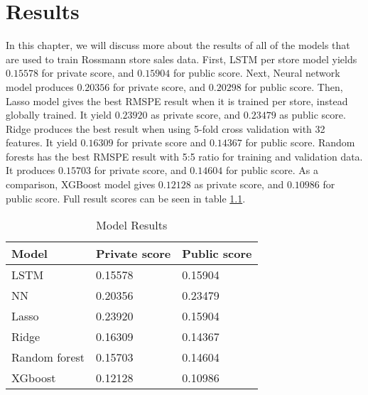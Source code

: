 \chapter{Results}
In this chapter, we will discuss more about the results of all of the models that are used to train Rossmann store sales data. 
First, LSTM per store model yields $0.15578$ for private score, and $0.15904$ for public score. Next, Neural network model produces $0.20356$ for private score, and $0.20298$ for public score. Then, Lasso model gives the best RMSPE result when it is trained per store, instead globally trained. It yield $0.23920$ as private score, and $0.23479$ as public score. Ridge produces the best result when using 5-fold cross validation with 32 features. It yield $0.16309$ for private score and $0.14367$ for public score. Random forests has the best RMSPE result with 5:5 ratio for training and validation data. It produces $0.15703$ for private score, and $0.14604$ for public score. As a comparison, XGBoost model gives $0.12128$ as private score, and $0.10986$ for public score. Full result scores can be seen in table \ref{tab:result}.
\begin{table}[H]
	\centering
	\caption{Model Results}
	\label{tab:result}
	\begin{tabular}{|m{200pt}|m{100pt}|m{100pt}}
		\hline
		Model & Private score & Public score  \\ \hline
		LSTM & 0.15578 & 0.15904 \\ \hline
		NN & 0.20356 & 0.23479 \\ \hline
		Lasso & 0.23920 & 0.15904 \\ \hline
		Ridge & 0.16309 & 0.14367 \\ \hline
		Random forest & 0.15703 & 0.14604 \\ \hline
		XGboost & 0.12128 & 0.10986 \\ \hline
	\end{tabular}
\end{table}
